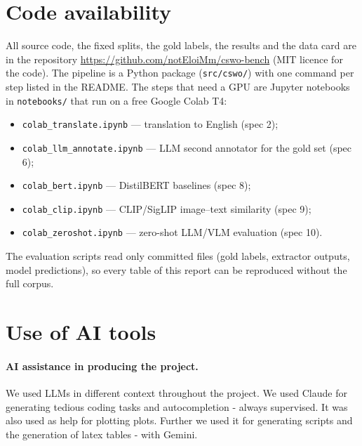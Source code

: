 \section{Code availability}
\label{sec:code}

All source code, the fixed splits, the gold labels, the results and the data card are in the repository
\url{https://github.com/notEloiMm/cswo-bench} (MIT licence for the code). The pipeline is a Python package
(\texttt{src/cswo/}) with one command per step listed in the README. The steps that need a GPU
are Jupyter notebooks in \texttt{notebooks/} that run on a free Google Colab T4:
\begin{itemize}
  \item \texttt{colab\_translate.ipynb} --- translation to English (spec 2);
  \item \texttt{colab\_llm\_annotate.ipynb} --- LLM second annotator for the gold set (spec 6);
  \item \texttt{colab\_bert.ipynb} --- DistilBERT baselines (spec 8);
  \item \texttt{colab\_clip.ipynb} --- CLIP/SigLIP image--text similarity (spec 9);
  \item \texttt{colab\_zeroshot.ipynb} --- zero-shot LLM/VLM evaluation (spec 10).
\end{itemize}
The evaluation scripts read only committed files (gold labels, extractor outputs, model predictions), so every table
of this report can be reproduced without the full corpus.

\section{Use of AI tools}
\label{sec:ai}

\paragraph{AI assistance in producing the project.} 
We used LLMs in different context throughout the project. 
We used Claude for generating tedious coding tasks and autocompletion - always supervised. It was also used as help for plotting plots.  Further we used it for generating scripts and the 
generation of latex tables - with Gemini. 
